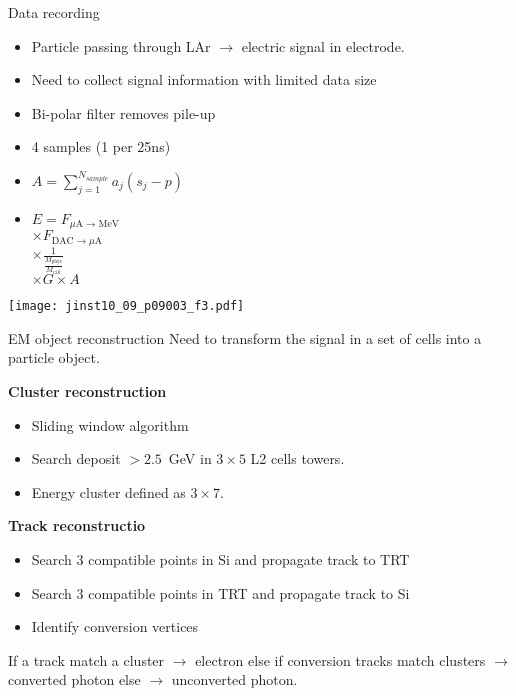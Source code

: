 \begin{frame}{Data recording}
  \begin{itemize}
    \item Particle passing through LAr $\rightarrow$ electric signal in electrode.
    \item Need to collect signal information with limited data size
  \end{itemize}

  \begin{minipage}{0.49\linewidth}
    \begin{itemize}
    \item Bi-polar filter removes pile-up
    \item 4 samples (1 per 25ns)
    \item $A = \sum_{j=1}^{N_{sample}} a_j(s_j-p)$

\vfill
    \item $E = F_{\mu \mbox{A}\rightarrow \mbox{MeV}}  $ \\ $ \times    F_{\mbox{DAC}\rightarrow\mu\mbox{A}}$  \\  $  \times     \frac{1}{\frac{M_{\mbox{phys}}}{M_{\mbox{cali}}}} $  \\  $\times G \times A $
      \end{itemize}
  \end{minipage}
  \hfill
  \begin{minipage}{0.49\linewidth}
    \texttt{[image: jinst10\_09\_p09003\_f3.pdf]}
  \end{minipage}

\end{frame}
\begin{frame}{EM object reconstruction}
  Need to transform the signal in a set of cells into a particle object.
\vfill
  \begin{minipage}[t]{0.49\linewidth}
    {\bf Cluster reconstruction }
    \begin{itemize}
    \item Sliding window algorithm
    \item Search deposit $>2.5$~GeV in $3\times 5$ L2 cells towers.
    \item Energy cluster defined as $3\times 7$.
    \end{itemize}
    \end{minipage}
    \hfill
    \begin{minipage}[t]{0.49\linewidth}
      {\bf Track reconstructio }
      \begin{itemize}
      \item Search 3 compatible points in Si and propagate track to TRT
      \item Search 3 compatible points in TRT and propagate track to Si
      \item Identify conversion vertices
      \end{itemize}
    \end{minipage}
    \vfill
  If a track match a cluster $\rightarrow$ electron
  else if conversion tracks match clusters $\rightarrow$ converted photon
  else $\rightarrow$ unconverted photon.
\end{frame}
